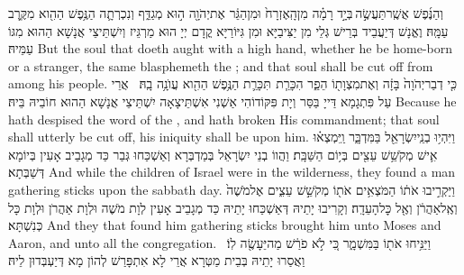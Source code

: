 {וְהַנֶּ֜פֶשׁ אֲשֶֽׁר\maqqaf תַּעֲשֶׂ֣ה \legarmeh  בְּיָ֣ד רָמָ֗ה מִן\maqqaf הָֽאֶזְרָח֙ וּמִן\maqqaf הַגֵּ֔ר אֶת\maqqaf יְהֹוָ֖ה ה֣וּא מְגַדֵּ֑ף וְנִכְרְתָ֛ה הַנֶּ֥פֶשׁ הַהִ֖וא מִקֶּ֥רֶב עַמָּֽהּ׃}
{וֶאֱנָשׁ דְּיַעֲבֵיד בְּרֵישׁ גְּלֵי מִן יַצִּיבַיָּא וּמִן גִּיּוֹרַיָּא קֳדָם יְיָ הוּא מַרְגֵּיז וְיִשְׁתֵּיצֵי אֲנָשָׁא הַהוּא מִגּוֹ עַמֵּיהּ׃}
{But the soul that doeth aught with a high hand, whether he be home-born or a stranger, the same blasphemeth the \lord; and that soul shall be cut off from among his people.}{}
{כִּ֤י דְבַר\maqqaf יְהֹוָה֙ בָּזָ֔ה וְאֶת\maqqaf מִצְוָת֖וֹ הֵפַ֑ר הִכָּרֵ֧ת \pasek  תִּכָּרֵ֛ת הַנֶּ֥פֶשׁ הַהִ֖וא עֲוֺנָ֥ה בָֽהּ׃ \petucha }
{אֲרֵי עַל פִּתְגָמָא דַּייָ בַּסַּר וְיָת פִּקּוֹדוֹהִי אַשְׁנִי אִשְׁתֵּיצָאָה יִשְׁתֵּיצֵי אֲנָשָׁא הַהוּא חוֹבֵיהּ בֵּיהּ׃}
{Because he hath despised the word of the \lord, and hath broken His commandment; that soul shall utterly be cut off, his iniquity shall be upon him.}{}
{וַיִּהְי֥וּ בְנֵֽי\maqqaf יִשְׂרָאֵ֖ל בַּמִּדְבָּ֑ר וַֽיִּמְצְא֗וּ אִ֛ישׁ מְקֹשֵׁ֥שׁ עֵצִ֖ים בְּי֥וֹם הַשַּׁבָּֽת׃}
{וַהֲווֹ בְנֵי יִשְׂרָאֵל בְּמַדְבְּרָא וְאַשְׁכַּחוּ גְּבַר כַּד מְגָבֵיב אָעִין בְּיוֹמָא דְּשַׁבְּתָא׃}
{And while the children of Israel were in the wilderness, they found a man gathering sticks upon the sabbath day.}{}
{וַיַּקְרִ֣יבוּ אֹת֔וֹ הַמֹּצְאִ֥ים אֹת֖וֹ מְקֹשֵׁ֣שׁ עֵצִ֑ים אֶל\maqqaf מֹשֶׁה֙ וְאֶֽל\maqqaf אַהֲרֹ֔ן וְאֶ֖ל כׇּל\maqqaf הָעֵדָֽה׃}
{וְקָרִיבוּ יָתֵיהּ דְּאַשְׁכַּחוּ יָתֵיהּ כַּד מְגָבֵיב אָעִין לְוָת מֹשֶׁה וּלְוָת אַהֲרֹן וּלְוָת כָּל כְּנִשְׁתָּא׃}
{And they that found him gathering sticks brought him unto Moses and Aaron, and unto all the congregation.}{}
{וַיַּנִּ֥יחוּ אֹת֖וֹ בַּמִּשְׁמָ֑ר כִּ֚י לֹ֣א פֹרַ֔שׁ מַה\maqqaf יֵּעָשֶׂ֖ה לֽוֹ׃ \setuma }
{וַאֲסַרוּ יָתֵיהּ בְּבֵית מַטְּרָא אֲרֵי לָא אִתְפָּרַשׁ לְהוֹן מָא דְּיַעְבְּדוּן לֵיהּ׃}
